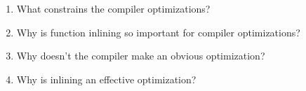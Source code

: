 \begin{enumerate}
\item 
What constrains the compiler optimizations?

\item 
Why is function inlining so important for compiler optimizations?

\item 
Why doesn't the compiler make an obvious optimization?

\item
Why is inlining an effective optimization?
	
\end{enumerate}